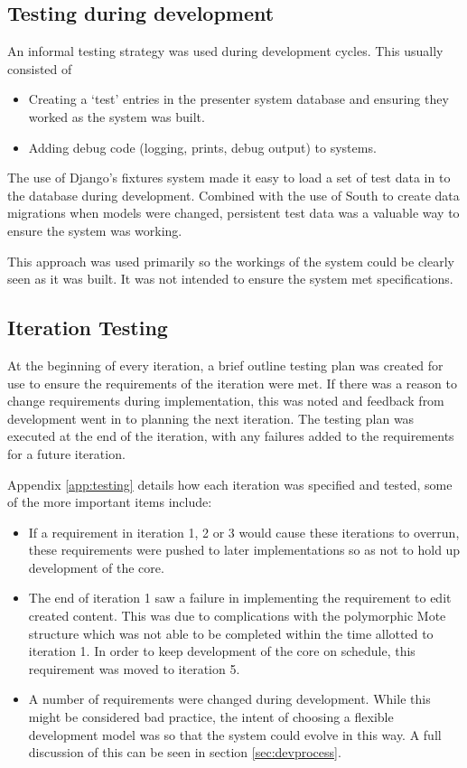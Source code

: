 \documentclass[a4papert,11pt,notitlepage]{article}
\begin{document}
\subsection{Testing during development}
An informal testing strategy was used during development cycles. This usually consisted of
\begin{itemize}
\item Creating a `test' entries in the presenter system database and ensuring they worked as the system was built. 
\item Adding debug code (logging, prints, debug output) to systems.
\end{itemize}

The use of Django's fixtures system made it easy to load a set of test data in to the database during development. Combined with the use of South\cite{south:web} to create data migrations when models were changed, persistent test data was a valuable way to ensure the system was working.

This approach was used primarily so the workings of the system could be clearly seen as it was built. It was not intended to ensure the system met specifications.

\subsection{Iteration Testing}
At the beginning of every iteration, a brief outline testing plan was created for use to ensure the requirements of the iteration were met. If there was a reason to change requirements during implementation, this was noted and feedback from development went in to planning the next iteration. The testing plan was executed at the end of the iteration, with any failures added to the requirements for a future iteration.

Appendix \ref{app:testing} details how each iteration was specified and tested, some of the more important items include:
\begin{itemize}
\item If a requirement in iteration 1, 2 or 3 would cause these iterations to overrun, these requirements were pushed to later implementations so as not to hold up development of the core.
\item The end of iteration 1 saw a failure in implementing the requirement to edit created content. This was due to complications with the polymorphic Mote structure which was not able to be completed within the time allotted to iteration 1. In order to keep development of the core on schedule, this requirement was moved to iteration 5.
\item A number of requirements were changed during development. While this might be considered bad practice, the intent of choosing a flexible development model was so that the system could evolve in this way. A full discussion of this can be seen in section \ref{sec:devprocess}.
\end{itemize}
\end{document}
